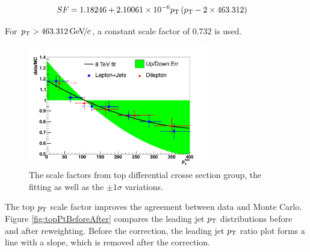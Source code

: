 \begin{align*}
SF &= 1.18246 + 2.10061\times 10^{-6} p_{\mathrm{T}} \left(p_{\mathrm{T}} - 2 \times 463.312 \right)
\end{align*}

\noindent For $p_{\mathrm{T}} > 463.312 {\,\text{Ge\hspace{-.08em}V\hspace{-0.16em}/\hspace{-0.08em}}c}$, a constant scale factor of $0.732$ is used.


\begin{figure}[hbtp]
 \begin{center}
   \includegraphics[width=0.7\textwidth]{Figures/Analysis_2_Diagrams/topptsys.pdf}
   \caption{The scale factors from top differential crosse section
     group, the fitting as well as the $\pm1\sigma$
     variations.}
   \label{fig:topptsys}
   \end{center}
\end{figure}


\par The top $p_{\mathrm{T}}$ scale factor improves the agreement
between data and Monte Carlo. Figure \ref{fig:topPtBeforeAfter}
compares the leading jet $p_{\mathrm{T}}$ distributions before and after
reweighting. Before the correction, the
leading jet $p_{\mathrm{T}}$ ratio plot forms a line with a slope, which is
removed after the correction. 

